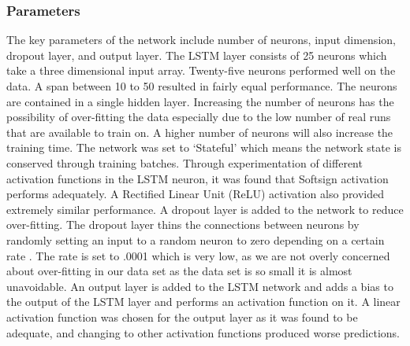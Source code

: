 \subsubsection{Parameters} \label{lstmparameters}
The key parameters of the network include number of neurons, input dimension, dropout layer, and output layer. The LSTM layer consists of 25 neurons which take a three dimensional input array. Twenty-five neurons performed well on the data. A span between 10 to 50 resulted in fairly equal performance. The neurons are contained in a single hidden layer. Increasing the number of neurons has the possibility of over-fitting the data especially due to the low number of real runs that are available to train on. A higher number of neurons will also increase the training time. The network was set to ‘Stateful’ which means the network state is conserved through training batches. Through experimentation of different activation functions in the LSTM neuron, it was found that Softsign activation performs adequately. A Rectified Linear Unit (ReLU) activation also provided extremely similar performance. A dropout layer is added to the network to reduce over-fitting. The dropout layer thins the connections between neurons by randomly setting an input to a random neuron to zero depending on a certain rate \cite{dropout}. The rate is set to .0001 which is very low, as we are not overly concerned about over-fitting in our data set as the data set is so small it is almost unavoidable. An output layer is added to the LSTM network and adds a bias to the output of the LSTM layer and performs an activation function on it. A linear activation function was chosen for the output layer as it was found to be adequate, and changing to other activation functions produced worse predictions.
